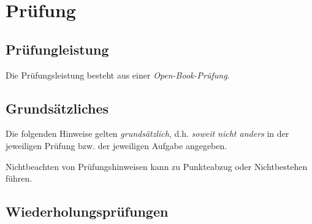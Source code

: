 \documentclass[
  a4paper,
  DIV=11]{scrreprt}
\theoremstyle{definition}
\theoremstyle{remark}
\begin{document}

\hypertarget{pruxfcfung}{%
\chapter{Prüfung}\label{pruxfcfung}}

\hypertarget{pruxfcfungleistung}{%
\section{Prüfungleistung}\label{pruxfcfungleistung}}

Die Prüfungsleistung besteht aus einer \emph{Open-Book-Prüfung}.

\hypertarget{grundsuxe4tzliches}{%
\section{Grundsätzliches}\label{grundsuxe4tzliches}}

Die folgenden Hinweise gelten \emph{grundsätzlich}, d.h. \emph{soweit
nicht anders} in der jeweiligen Prüfung bzw. der jeweiligen Aufgabe
angegeben.

Nichtbeachten von Prüfungshinweisen kann zu Punkteabzug oder
Nichtbestehen führen.

\hypertarget{wiederholungspruxfcfungen}{%
\section{Wiederholungsprüfungen}\label{wiederholungspruxfcfungen}}
\end{document}
